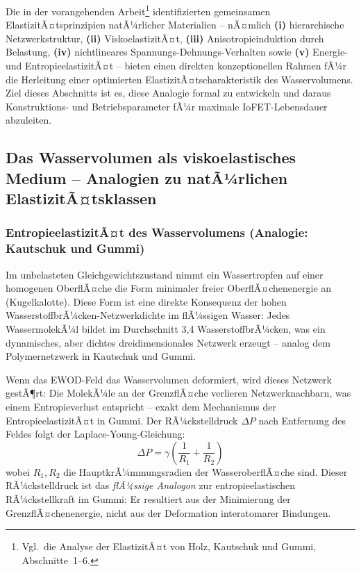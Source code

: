 ﻿\documentclass[a4paper,12pt]{scrreprt}
\theoremstyle{definition}
\begin{document}
Die in der vorangehenden Arbeit\footnote{Vgl.\ die Analyse der ElastizitÃ¤t
	von Holz, Kautschuk und Gummi, Abschnitte~1--6.} identifizierten
gemeinsamen ElastizitÃ¤tsprinzipien natÃ¼rlicher Materialien -- nÃ¤mlich
\textbf{(i)} hierarchische Netzwerkstruktur, \textbf{(ii)} ViskoelastizitÃ¤t,
\textbf{(iii)} Anisotropieinduktion durch Belastung, \textbf{(iv)} nichtlineares
Spannungs-Dehnungs-Verhalten sowie \textbf{(v)} Energie- und EntropieelastizitÃ¤t --
bieten einen direkten konzeptionellen Rahmen fÃ¼r die Herleitung einer
optimierten ElastizitÃ¤tscharakteristik des Wasservolumens. Ziel dieses
Abschnitts ist es, diese Analogie formal zu entwickeln und daraus
Konstruktions- und Betriebsparameter fÃ¼r maximale IoFET-Lebensdauer
abzuleiten.

\subsection{Das Wasservolumen als viskoelastisches Medium -- Analogien zu
	natÃ¼rlichen ElastizitÃ¤tsklassen}

\subsubsection{EntropieelastizitÃ¤t des Wasservolumens (Analogie: Kautschuk und Gummi)}

Im unbelasteten Gleichgewichtszustand nimmt ein Wassertropfen auf einer
homogenen OberflÃ¤che die Form minimaler freier OberflÃ¤chenenergie an
(Kugelkalotte). Diese Form ist eine direkte Konsequenz der hohen
WasserstoffbrÃ¼cken-Netzwerkdichte im flÃ¼ssigen Wasser: Jedes
WassermolekÃ¼l bildet im Durchschnitt 3,4 WasserstoffbrÃ¼cken, was ein
dynamisches, aber dichtes dreidimensionales Netzwerk erzeugt -- analog
dem Polymernetzwerk in Kautschuk und Gummi.

Wenn das EWOD-Feld das Wasservolumen deformiert, wird dieses Netzwerk
gestÃ¶rt: Die MolekÃ¼le an der GrenzflÃ¤che verlieren Netzwerknachbarn,
was einem Entropieverlust entspricht -- exakt dem Mechanismus der
EntropieelastizitÃ¤t in Gummi. Der RÃ¼ckstelldruck $\Delta P$ nach
Entfernung des Feldes folgt der Laplace-Young-Gleichung:
\begin{equation}
	\Delta P = \gamma \left(\frac{1}{R_1} + \frac{1}{R_2}\right)
	\label{eq:laplace_rueckstell}
\end{equation}
wobei $R_1, R_2$ die HauptkrÃ¼mmungsradien der WasseroberflÃ¤che sind.
Dieser RÃ¼ckstelldruck ist das \emph{flÃ¼ssige Analogon} zur entropieelastischen
RÃ¼ckstellkraft im Gummi: Er resultiert aus der Minimierung der
GrenzflÃ¤chenenergie, nicht aus der Deformation interatomarer Bindungen.
\end{document}
